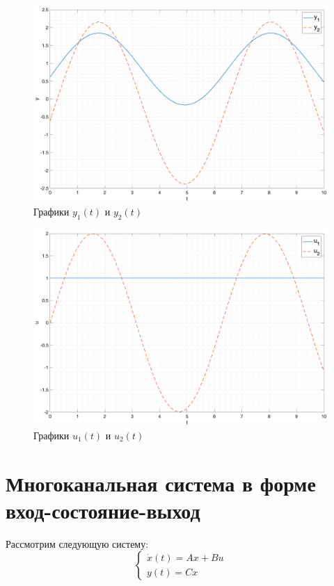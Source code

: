 \begin{figure}[ht!]
    \centering
    \includegraphics[width=\textwidth]{media/sys5_y(t).png}
    \caption{Графики $y_1(t)$ и $y_2(t)$}
    \label{fig:yt5}
\end{figure}

\begin{figure}[ht!]
    \centering
    \includegraphics[width=\textwidth]{media/sys5_u(t).png}
    \caption{Графики $u_1(t)$ и $u_2(t)$}
    \label{fig:ut5}
\end{figure}

\FloatBarrier
\section{Многоканальная система в форме вход-состояние-выход}

Рассмотрим следующую систему:
\begin{equation}
    \begin{cases}
        \dot{x}(t) = A x + B u \\
        y(t) = Cx
    \end{cases}
\end{equation}

